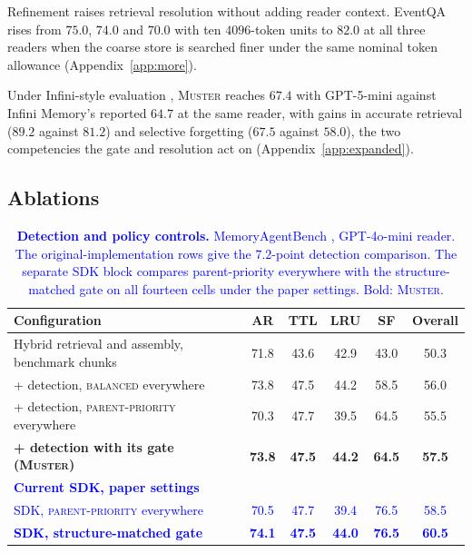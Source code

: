 \documentclass{article}
\newcommand{\ours}{\rowcolor{oursbg}}
\newcommand{\nativechange}[1]{\textcolor{blue}{#1}}
\newcommand{\tabfont}{\fontsize{7.5}{8.5}\selectfont\renewcommand{\arraystretch}{1.0}}
\newcommand{\sys}{\textsc{Muster}}
\newcommand{\balanced}{\textsc{balanced}}
\newcommand{\parprio}{\textsc{parent-priority}}
\begin{document}
Refinement raises retrieval resolution without adding reader context. EventQA rises from $75.0$, $74.0$ and $70.0$ with ten $4096$-token units to $82.0$ at all three readers when the coarse store is searched finer under the same nominal token allowance (Appendix~\ref{app:more}).

Under Infini-style evaluation \cite{infini}, \sys{} reaches $67.4$ with GPT-5-mini against Infini Memory's reported $64.7$ at the same reader, with gains in accurate retrieval ($89.2$ against $81.2$) and selective forgetting ($67.5$ against $58.0$), the two competencies the gate and resolution act on (Appendix~\ref{app:expanded}).

\subsection{Ablations}\label{sec:ablations}

\begin{table}[t]
\centering\tabfont
\caption{\nativechange{\textbf{Detection and policy controls.} MemoryAgentBench \cite{mab}, GPT-4o-mini \cite{gpt4omini} reader. The original-implementation rows give the $7.2$-point detection comparison. The separate SDK block compares parent-priority everywhere with the structure-matched gate on all fourteen cells under the paper settings. Bold: \sys{}.}}
\label{tab:gate}
\setlength{\tabcolsep}{3pt}\setlength{\aboverulesep}{0pt}\setlength{\belowrulesep}{0pt}\setlength{\extrarowheight}{0.8pt}
\begin{tabular}{l*{5}{c}}
\toprule
Configuration & AR & TTL & LRU & SF & Overall \\
\midrule
Hybrid retrieval and assembly, benchmark chunks & 71.8 & 43.6 & 42.9 & 43.0 & 50.3 \\
\midrule
+ detection, \balanced{} everywhere & 73.8 & 47.5 & 44.2 & 58.5 & 56.0 \\
+ detection, \parprio{} everywhere & 70.3 & 47.7 & 39.5 & 64.5 & 55.5 \\
\midrule
\ours \textbf{+ detection with its gate (\sys{})} & \textbf{73.8} & \textbf{47.5} & \textbf{44.2} & \textbf{64.5} & \textbf{57.5} \\
\midrule[\heavyrulewidth]
\multicolumn{6}{l}{\nativechange{\textbf{Current SDK, paper settings}}}\\
\nativechange{SDK, \parprio{} everywhere} & \nativechange{70.5} & \nativechange{47.7} & \nativechange{39.4} & \nativechange{76.5} & \nativechange{58.5} \\
\ours \nativechange{\textbf{SDK, structure-matched gate}} & \nativechange{\textbf{74.1}} & \nativechange{\textbf{47.5}} & \nativechange{\textbf{44.0}} & \nativechange{\textbf{76.5}} & \nativechange{\textbf{60.5}} \\
\bottomrule
\end{tabular}
\end{table}
\end{document}

